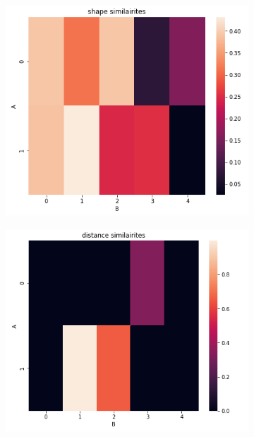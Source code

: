 \begin{figure}[H]
\centering
\begin{subfigure}[H]{0.51\textwidth}
    \centering
\includegraphics[width=\linewidth]{figures/chapter4/velopix_clusters/shape.png}
\end{subfigure}
\begin{subfigure}[H]{0.51\textwidth}
    \centering
\includegraphics[width=\linewidth]{figures/chapter4/velopix_clusters/distance.png}
\end{subfigure}

\end{figure}
